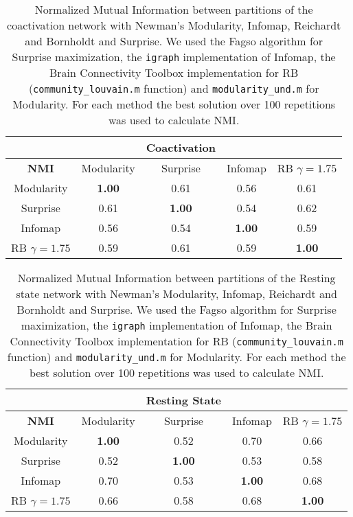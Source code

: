\begin{table}
\centering
\begin{tabular}{ccccc}
& & \textbf{Coactivation} & \\
\hline 
\textbf{NMI} &Modularity & Surprise & Infomap & RB $\gamma=1.75$ \\
\hline
Modularity 			& \textbf{1.00} & 0.61 & 0.56 & 0.61 \\
Surprise 			& 0.61 & \textbf{1.00} & 0.54 & 0.62 \\
Infomap 			& 0.56 & 0.54 & \textbf{1.00} & 0.59 \\
RB $\gamma=1.75$ 	& 0.59 & 0.61 & 0.59 & \textbf{1.00} \\ \hline 
\end{tabular}
\caption{Normalized Mutual Information between partitions of the coactivation network with Newman's Modularity, Infomap, Reichardt and Bornholdt and Surprise.
We used the Fagso algorithm for Surprise maximization, the \texttt{igraph} implementation of Infomap, the Brain Connectivity Toolbox implementation for RB (\texttt{community\_louvain.m} function) and \texttt{modularity\_und.m} for Modularity.
For each method the best solution over 100 repetitions was used to calculate NMI.}
\label{tab:coact_nmi_fagso}
\end{table}

\begin{table}
\centering
\begin{tabular}{ccccc}
& & \textbf{Resting State} & \\
\hline 
\textbf{NMI} &Modularity & Surprise & Infomap & RB $\gamma=1.75$ \\
\hline
Modularity & \textbf{1.00} & 0.52 &  0.70 & 0.66 \\
Surprise & 0.52 & \textbf{1.00} & 0.53 & 0.58 \\
Infomap & 0.70 & 0.53 & \textbf{1.00} & 0.68 \\
RB $\gamma=1.75$ & 0.66 & 0.58 & 0.68 & \textbf{1.00} \\ \hline 
\end{tabular}
\caption{Normalized Mutual Information between partitions of the Resting state network with Newman's Modularity, Infomap, Reichardt and Bornholdt and Surprise.
We used the Fagso algorithm for Surprise maximization, the \texttt{igraph} implementation of Infomap, the Brain Connectivity Toolbox implementation for RB (\texttt{community\_louvain.m} function) and \texttt{modularity\_und.m} for Modularity.
For each method the best solution over 100 repetitions was used to calculate NMI.}
\label{tab:rs_nmi_fagso}
\end{table}

